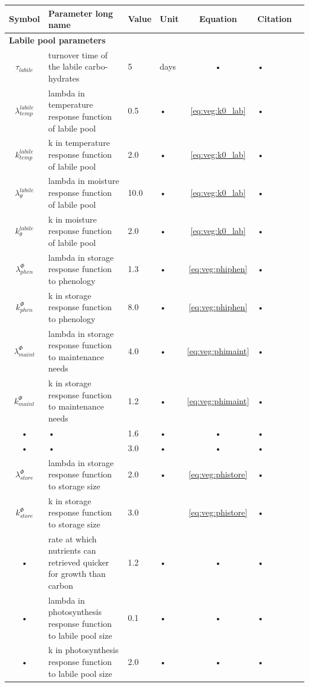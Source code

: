 \documentclass[11pt,oneside,openright,a4paper,fleqn]{book}  %
\begin{document}
\begin{table}
\begin{tabularx}{\linewidth}{|c|X|l|l|c|l|c|} %
\hline 
Symbol & Parameter long name & Value & Unit & Equation & Citation \\
\hline 

\multicolumn{6}{l}{\bf Labile pool parameters}\\
\hline
$\tau_{labile}$ & turnover time of the labile carbo-hydrates & 5 & days & • & • \\
$\lambda^{labile}_{temp}$ & lambda in temperature response function of labile pool & 0.5 & • & \ref{eq:veg:k0_lab} & • \\
$k^{labile}_{temp}$ & k in temperature response function of labile pool & 2.0 & • & \ref{eq:veg:k0_lab} & • \\
$\lambda^{labile}_{\theta}$ & lambda in moisture response function of labile pool & 10.0 & • & \ref{eq:veg:k0_lab} & • \\
$k^{labile}_{\theta}$ & k in moisture response function of labile pool & 2.0 & • & \ref{eq:veg:k0_lab} & • \\
$\lambda^{\Phi}_{phen}$ & lambda in storage response function to phenology & 1.3 & • & \ref{eq:veg:phiphen} & • \\
$k^{\Phi}_{phen}$ & k in storage response function to phenology & 8.0 & • & \ref{eq:veg:phiphen} & • \\
$\lambda^{\Phi}_{maint}$ & lambda in storage response function to maintenance needs & 4.0 & • & \ref{eq:veg:phimaint} & • \\
$k^{\Phi}_{maint}$ & k in storage response function to maintenance needs & 1.2 & • & \ref{eq:veg:phimaint} & • \\
• & • & 1.6 & • & • & • \\
• & • & 3.0 & • & • & • \\
$\lambda^{\Phi}_{store}$ & lambda in storage response function to storage size & 2.0 & • & \ref{eq:veg:phistore} & • \\
$k^{\Phi}_{store}$ & k in storage response function to storage size & 3.0 & & \ref{eq:veg:phistore} & • \\
• & rate at which nutrients can retrieved quicker for growth than carbon & 1.2 & • & • & • \\
• & lambda in photosynthesis response function to labile pool size & 0.1 & • & • & • \\
• & k in photosynthesis response function to labile pool size & 2.0 & • & • & • \\

\end{tabularx}
\end{table}
\end{document}
